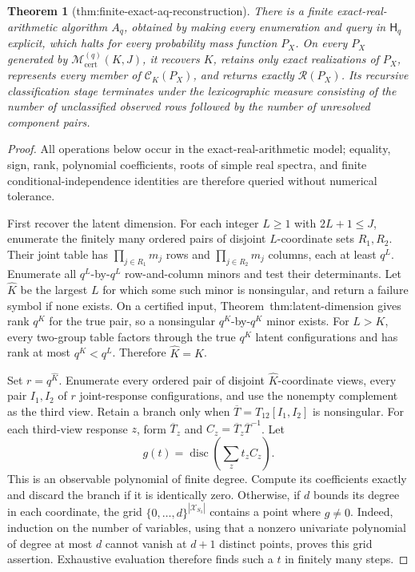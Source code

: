 \documentclass{article}
\newtheorem{theorem}{Theorem}
\begin{document}
\begin{theorem}[thm:finite-exact-aq-reconstruction]\label{thm:finite-exact-aq-reconstruction}
There is a finite exact-real-arithmetic algorithm \(A_q\), obtained by making every enumeration and query in \(\mathsf H_q\) explicit, which halts for every probability mass function \(P_X\). On every \(P_X\) generated by \(\mathcal M_{\mathrm{cert}}^{(q)}(K,J)\), it recovers \(K\), retains only exact realizations of \(P_X\), represents every member of \(\mathcal C_K(P_X)\), and returns exactly \(\mathcal R(P_X)\). Its recursive classification stage terminates under the lexicographic measure consisting of the number of unclassified observed rows followed by the number of unresolved component pairs.
\end{theorem}
\begin{proof}
All operations below occur in the exact-real-arithmetic model; equality, sign, rank, polynomial coefficients, roots of simple real spectra, and finite conditional-independence identities are therefore queried without numerical tolerance.

First recover the latent dimension.  For each integer \(L\ge1\) with \(2L+1\le J\), enumerate the finitely many ordered pairs of disjoint \(L\)-coordinate sets \(R_1,R_2\).  Their joint table has \(\prod_{j\in R_1}m_j\) rows and \(\prod_{j\in R_2}m_j\) columns, each at least \(q^L\).  Enumerate all \(q^L\)-by-\(q^L\) row-and-column minors and test their determinants.  Let \(\widehat K\) be the largest \(L\) for which some such minor is nonsingular, and return a failure symbol if none exists.  On a certified input, Theorem~\textnormal{thm:latent-dimension} gives rank \(q^K\) for the true pair, so a nonsingular \(q^K\)-by-\(q^K\) minor exists.  For \(L>K\), every two-group table factors through the true \(q^K\) latent configurations and has rank at most \(q^K<q^L\).  Therefore \(\widehat K=K\).

Set \(r=q^{\widehat K}\).  Enumerate every ordered pair of disjoint \(\widehat K\)-coordinate views, every pair \(I_1,I_2\) of \(r\) joint-response configurations, and use the nonempty complement as the third view.  Retain a branch only when \(\overline T=T_{12}[I_1,I_2]\) is nonsingular.  For each third-view response \(z\), form \(\overline T_z\) and \(C_z=\overline T_z\overline T^{-1}\).  Let
\[
 g(t)=\operatorname{disc}\!\left(\sum_zt_zC_z\right).
\]
This is an observable polynomial of finite degree.  Compute its coefficients exactly and discard the branch if it is identically zero.  Otherwise, if \(d\) bounds its degree in each coordinate, the grid \(\{0,\ldots,d\}^{|\mathcal X_{S_3}|}\) contains a point where \(g\neq0\).  Indeed, induction on the number of variables, using that a nonzero univariate polynomial of degree at most \(d\) cannot vanish at \(d+1\) distinct points, proves this grid assertion.  Exhaustive evaluation therefore finds such a \(t\) in finitely many steps.


\end{proof}
\end{document}
